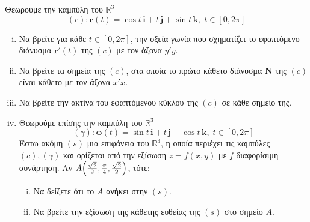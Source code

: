 \documentclass[a4paper,table]{report}
\begin{document}
\begin{mybox3}
  \setcounter{thm}{1}
  \begin{thema}
    Θεωρούμε την καμπύλη του $ \mathbb{R}^{3} $
    \[
      (c) \colon \mathbf{r}(t)= \cos{t}
      \,
      \mathbf{i} + t \, \mathbf{j} +  \sin{t} \, \mathbf{k}, \; t \in [0, 2 \pi]
    \]
  \begin{enumerate}[i)]
    \item Να βρείτε για κάθε $ t \in [0,2 \pi] $, την οξεία γωνία που σχηματίζει το
      εφαπτόμενο διάνυσμα $ \mathbf{r'}(t) $ της $ (c) $ με τον άξονα $ y'y $. 
    \item Να βρείτε τα σημεία της $ (c) $, στα οποία το πρώτο κάθετο διάνυσμα 
      $ \mathbf{N} $ της $ (c) $ είναι κάθετο με τον άξονα $ x'x $.
    \item Να βρείτε την ακτίνα του εφαπτόμενου κύκλου της $ (c) $ σε κάθε σημείο της.
    \item Θεωρούμε επίσης την καμπύλη του $ \mathbb{R}^{3} $
      \[
        (\gamma) \colon
        \mathbf{\phi}(t)= \sin{t} \, \mathbf{i} + t \, \mathbf{j} + \cos{t} \, \mathbf{k},
        \; t \in [0,2 \pi]
      \]
      Έστω ακόμη $ (s) $ μια επιφάνεια του $ \mathbb{R}^{3} $, η 
      οποία περιέχει τις καμπύλες $ (c), (\gamma) $ και ορίζεται από την εξίσωση $ z=f(x,y)
      $ με $f$ διαφορίσιμη συνάρτηση. Αν $ A\Bigl(\frac{\sqrt{2}}{2} , \frac{\pi}{4} ,
      \frac{\sqrt{2}}{2}\Bigr) $, τότε:
      \begin{enumerate}[i)]
        \item Να δείξετε ότι το $A$ ανήκει στην $ (s) $.
        \item Να βρείτε την εξίσωση της κάθετης ευθείας της $ (s) $ στο σημείο $A$.
      \end{enumerate}
  \end{enumerate}
  \end{thema}
\end{mybox3}
\end{document}
